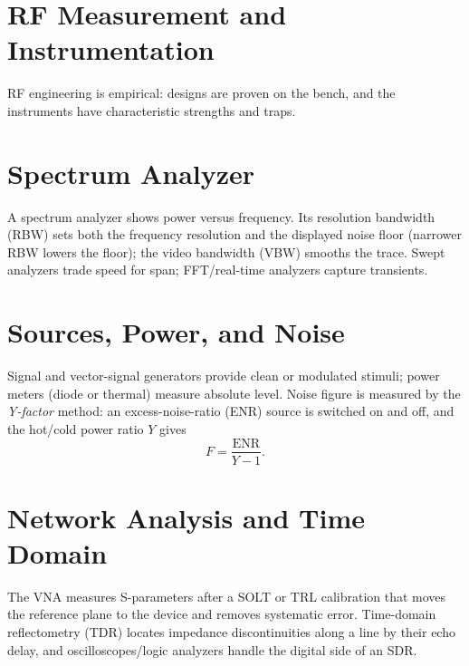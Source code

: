 \section{RF Measurement and Instrumentation}\label{sec:tb_measurement}



RF engineering is empirical: designs are proven on the bench, and the instruments
have characteristic strengths and traps.

\section{Spectrum Analyzer}
A spectrum analyzer shows power versus frequency. Its resolution bandwidth (RBW)
sets both the frequency resolution and the displayed noise floor (narrower RBW
lowers the floor); the video bandwidth (VBW) smooths the trace. Swept analyzers
trade speed for span; FFT/real-time analyzers capture transients.

\section{Sources, Power, and Noise}
Signal and vector-signal generators provide clean or modulated stimuli; power
meters (diode or thermal) measure absolute level. Noise figure is measured by the
\emph{Y-factor} method: an excess-noise-ratio (ENR) source is switched on and off,
and the hot/cold power ratio $Y$ gives
\[ F = \frac{\text{ENR}}{Y - 1}. \]

\section{Network Analysis and Time Domain}
The VNA measures S-parameters after a SOLT or TRL calibration that moves the
reference plane to the device and removes systematic error. Time-domain
reflectometry (TDR) locates impedance discontinuities along a line by their echo
delay, and oscilloscopes/logic analyzers handle the digital side of an SDR.



